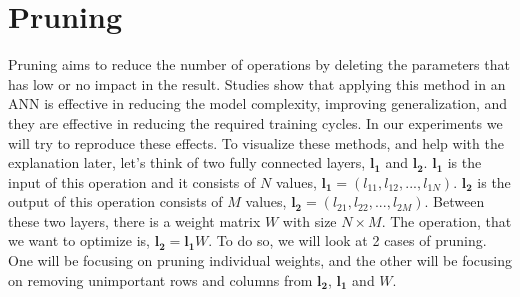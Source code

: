 \section{Pruning}
Pruning aims to reduce the number of operations by deleting the parameters that has low or no impact in the result. Studies show that applying this method in an ANN is effective in reducing the model complexity, improving generalization, and they are effective in reducing the required training cycles. In our experiments we will try to reproduce these effects.
To visualize these methods, and help with the explanation later, let's think of two fully connected layers, $\mathbf{l_1}$ and $\mathbf{l_2}$. $\mathbf{l_1}$ is the input of this operation and it consists of $N$ values, $\mathbf{l_1}=(l_{11}, l_{12}, ..., l_{1N})$. $\mathbf{l_2}$ is the output of this operation consists of $M$ values, $\mathbf{l_2}=(l_{21}, l_{22}, ..., l_{2M})$. Between these two layers, there is a weight matrix $W$ with size $N \times M$. The operation, that we want to optimize is, $\mathbf{l_2} = \mathbf{l_1}W$. To do so, we will look at 2 cases of pruning. One will be focusing on pruning individual weights, and the other will be focusing on removing unimportant rows and columns from $\mathbf{l_2}$, $\mathbf{l_1}$ and $W$. 

